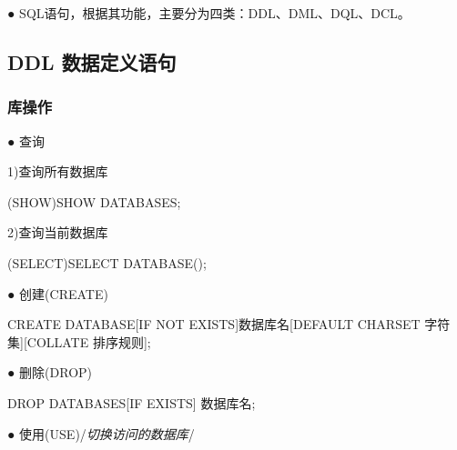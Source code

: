 \documentclass[
  letterpaper,
  DIV=11,
  numbers=noendperiod]{scrreprt}
\newenvironment{Shaded}{\begin{snugshade}}{\end{snugshade}}
\newcommand{\ControlFlowTok}[1]{\textcolor[rgb]{0.00,0.23,0.31}{#1}}
\newcommand{\KeywordTok}[1]{\textcolor[rgb]{0.00,0.23,0.31}{#1}}
\newcommand{\NormalTok}[1]{\textcolor[rgb]{0.00,0.23,0.31}{#1}}
\begin{document}
● SQL语句，根据其功能，主要分为四类：DDL、DML、DQL、DCL。

\hypertarget{ddl-ux6570ux636eux5b9aux4e49ux8bedux53e5}{%
\subsection{\texorpdfstring{DDL
\textbf{数据定义语句}}{DDL 数据定义语句}}\label{ddl-ux6570ux636eux5b9aux4e49ux8bedux53e5}}

\hypertarget{ux5e93ux64cdux4f5c}{%
\subsubsection{库操作}\label{ux5e93ux64cdux4f5c}}

● 查询

1)查询所有数据库

\begin{Shaded}
\begin{Highlighting}[]
\NormalTok{(SHOW)SHOW DATABASES;}
\end{Highlighting}
\end{Shaded}

2)查询当前数据库

\begin{Shaded}
\begin{Highlighting}[]
\NormalTok{(}\KeywordTok{SELECT}\NormalTok{)}\KeywordTok{SELECT} \KeywordTok{DATABASE}\NormalTok{();}
\end{Highlighting}
\end{Shaded}

● 创建(CREATE)

\begin{Shaded}
\begin{Highlighting}[]
\KeywordTok{CREATE} \KeywordTok{DATABASE}\NormalTok{[}\ControlFlowTok{IF} \KeywordTok{NOT} \KeywordTok{EXISTS}\NormalTok{]数据库名[}\KeywordTok{DEFAULT}\NormalTok{ CHARSET 字符集][COLLATE 排序规则];}
\end{Highlighting}
\end{Shaded}

● 删除(DROP)

\begin{Shaded}
\begin{Highlighting}[]
\KeywordTok{DROP}\NormalTok{ DATABASES[}\ControlFlowTok{IF} \KeywordTok{EXISTS}\NormalTok{] 数据库名;}
\end{Highlighting}
\end{Shaded}

● 使用(USE)/\emph{切换访问的数据库}/
\end{document}
